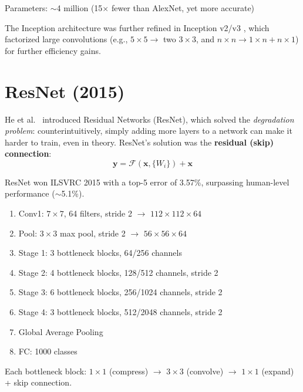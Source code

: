 Parameters: $\sim$4 million (15$\times$ fewer than AlexNet, yet more accurate)

The Inception architecture was further refined in Inception v2/v3 \cite{szegedy2016rethinking}, which factorized large convolutions (e.g., $5\times5 \rightarrow$ two $3\times3$, and $n\times n \rightarrow 1\times n + n\times 1$) for further efficiency gains.

\section{ResNet (2015)}

He et al.\ \cite{he2016deep} introduced Residual Networks (ResNet), which solved the \emph{degradation problem}: counterintuitively, simply adding more layers to a network can make it harder to train, even in theory. ResNet's solution was the \textbf{residual (skip) connection}:
\begin{equation}
\mathbf{y} = \mathcal{F}(\mathbf{x}, \{W_i\}) + \mathbf{x}
\end{equation}

ResNet won ILSVRC 2015 with a top-5 error of 3.57\%, surpassing human-level performance ($\sim$5.1\%).

\begin{architecture}
\begin{enumerate}
    \item Conv1: $7\times7$, 64 filters, stride 2 $\rightarrow$ $112\times112\times64$
    \item Pool: $3\times3$ max pool, stride 2 $\rightarrow$ $56\times56\times64$
    \item Stage 1: 3 bottleneck blocks, 64/256 channels
    \item Stage 2: 4 bottleneck blocks, 128/512 channels, stride 2
    \item Stage 3: 6 bottleneck blocks, 256/1024 channels, stride 2
    \item Stage 4: 3 bottleneck blocks, 512/2048 channels, stride 2
    \item Global Average Pooling
    \item FC: 1000 classes
\end{enumerate}
Each bottleneck block: $1\times1$ (compress) $\rightarrow$ $3\times3$ (convolve) $\rightarrow$ $1\times1$ (expand) + skip connection.
\end{architecture}

